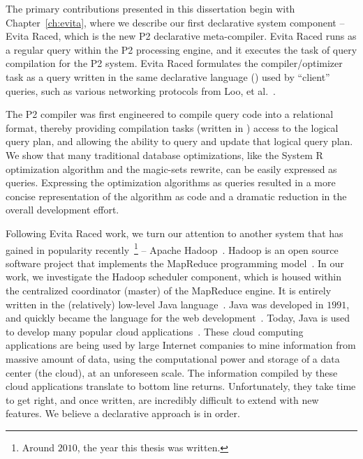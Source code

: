 The primary contributions presented in this dissertation begin with
Chapter~\ref{ch:evita}, where we describe our first declarative system
component -- Evita Raced, which is the new P2 declarative meta-compiler.  Evita
Raced runs as a regular query within the P2 processing engine, and it executes
the task of query compilation for the P2 system.  Evita Raced formulates the
compiler/optimizer task as a query written in the same declarative language
(\OVERLOG) used by ``client'' queries, such as various networking protocols
from Loo, et al.~\cite{loo-sigmod06, p2:sosp}.

The P2 compiler was first engineered to compile query code into a relational
format, thereby providing compilation tasks (written in \OVERLOG) access to the
logical query plan, and allowing the ability to query and update that logical
query plan.  We show that many traditional database optimizations, like the
System R optimization algorithm and the magic-sets rewrite, can be easily
expressed as \OVERLOG queries.  Expressing the optimization algorithms as
\OVERLOG queries resulted in a more concise representation of the algorithm as
code and a dramatic reduction in the overall development effort.
 
Following Evita Raced work, we turn our attention to another system that has
gained in popularity recently~\footnote{Around $2010$, the year this thesis was
written.} -- Apache Hadoop~\cite{hadoop}.  Hadoop is an open source software
project that implements the MapReduce programming model~\cite{mapreduce-osdi}.
In our work, we investigate the Hadoop scheduler component, which is housed
within the centralized coordinator (master) of the MapReduce engine.  It is
entirely written in the (relatively) low-level Java language~\cite{java}.  Java
was developed in $1991$, and quickly became the language for the web
development~\cite{java-history}.  Today, Java is used to develop many popular
{\emph cloud} applications~\cite{pig-sigmod, hive-vldb, zookeeper, hbase,
cassandra}.  These {\emph cloud computing} applications are being used by large
Internet companies to mine information from massive amount of data, using the
computational power and storage of a data center (the cloud), at an unforeseen
scale.  The information compiled by these cloud applications translate to
bottom line returns.  Unfortunately, they take time to get right, and once
written, are incredibly difficult to extend with new features.  We believe a
declarative approach is in order.


